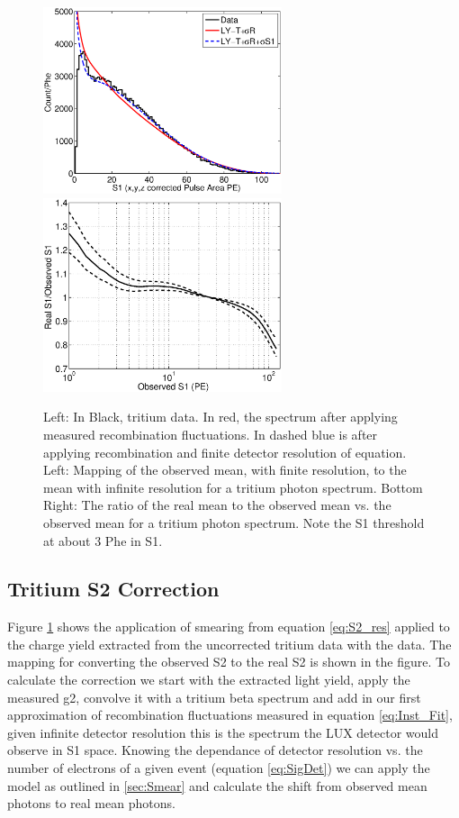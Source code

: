 \begin{figure}[h!]\centering
\includegraphics[width=70mm]{Chapter_Flucs/Figures/S1S2_Spectra/S1_spec_compare_iter1_.eps}
\includegraphics[width=70mm]{Chapter_Flucs/Figures/S1S2_Spectra/S1_corr_iter1_.eps}
\caption{Left: In Black, tritium data. In red, the spectrum after applying measured recombination fluctuations. In dashed blue is after applying recombination and finite detector resolution of equation. Left: Mapping of the observed mean, with finite resolution, to the mean with infinite resolution for a tritium photon spectrum. Bottom Right: The ratio of the real mean to the observed mean vs. the observed mean for a tritium photon spectrum. Note the S1 threshold at about 3 Phe in S1. }
\label{fig:S1_mapping_2}
\end{figure}

\subsection{Tritium S2 Correction}


Figure \ref{fig:S1_mapping_2} shows the application of smearing  from equation \ref{eq:S2_res} applied to the charge yield extracted from the uncorrected tritium data with the data. The mapping for converting the observed S2 to the real S2 is shown in the figure. To calculate the correction we start with the extracted light yield, apply the measured g2, convolve it with a tritium beta spectrum and add in our first approximation of recombination fluctuations measured in equation \ref{eq:Inst_Fit}, given infinite detector resolution this is the spectrum the LUX detector would observe in S1 space. Knowing the dependance of detector resolution vs. the number of electrons of a given event (equation \ref{eq:SigDet}) we can apply the model as outlined in \ref{sec:Smear} and calculate the shift from observed mean photons to real mean photons.

